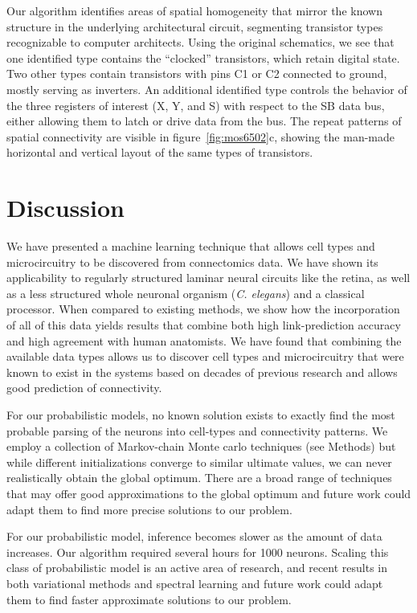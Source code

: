 \documentclass{article}
\begin{document}
{Our algorithm identifies areas of spatial homogeneity that mirror the
known structure in the underlying architectural circuit, segmenting
transistor types recognizable to computer architects. Using the
original schematics, we see that one identified type contains the
``clocked'' transistors, which retain digital state. Two other types
contain transistors with pins C1 or C2 connected to ground, mostly
serving as inverters.  An additional identified type controls the
behavior of the three registers of interest (X, Y, and S) with respect
to the SB data bus, either allowing them to latch or drive data from
the bus. The repeat patterns of spatial connectivity are visible in
figure~\ref{fig:mos6502}c, showing the man-made horizontal and
vertical layout of the same types of transistors.


\section*{Discussion}
We have presented a machine learning technique that allows cell types
and microcircuitry to be discovered from connectomics data.  We have
shown its applicability to regularly structured laminar neural
circuits like the retina, as well as a less structured whole neuronal
organism (\textit{C. elegans}) and a classical processor. When
compared to existing methods, we show how the incorporation of all of
this data yields results that combine both high link-prediction
accuracy and high agreement with human anatomists. We have found that
combining the available data types allows us to discover cell types
and microcircuitry that were known to exist in the systems based on
decades of previous research and allows good prediction of
connectivity.

For our probabilistic models, no known solution exists to
exactly find the most probable parsing of the neurons into cell-types
and connectivity patterns. We employ a collection of Markov-chain
Monte carlo techniques (see Methods) but while different
initializations converge to similar ultimate values, we can never
realistically obtain the global optimum. There are a broad range of
techniques that may offer good approximations to the global optimum
and future work could adapt them to
find more precise solutions to our problem.

For our probabilistic model, inference becomes slower as the amount of
data increases. Our algorithm required several hours for 1000
neurons. Scaling this class of probabilistic model is an active area
of research, and recent results in both variational methods
\autocite{Hoffman2013} and spectral learning \autocite{Anandkumar2012}
and future work could adapt them to find faster approximate solutions
to our problem.

}
\end{document}
